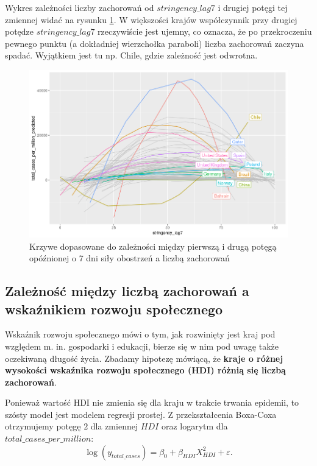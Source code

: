 \documentclass[12pt]{mwbk}
\theoremstyle{plain}
\theoremstyle{definition}
\theoremstyle{definition}
\newcommand\zrodlo[1]{\par\vspace{-3mm}{\small\textit{Źródło: }#1 }}
\begin{document}
\newpage
Wykres zależności liczby zachorowań od $stringency\_lag7$ i drugiej potęgi tej zmiennej widać na rysunku \ref{fig:stringency_2st}. W większości krajów współczynnik przy drugiej potędze $stringency\_lag7$ rzeczywiście jest ujemny, co oznacza, że po przekroczeniu pewnego punktu (a dokładniej wierzchołka paraboli) liczba zachorowań zaczyna spadać. Wyjątkiem jest tu np. Chile, gdzie zależność jest odwrotna.

\newpage

\begin{figure}[!h]
	\centering
	\includegraphics[width=\linewidth]{rys/stringency_2st.png}
	\caption{Krzywe dopasowane do zależności między pierwszą i drugą potęgą opóźnionej o 7 dni siły obostrzeń a liczbą zachorowań }
	\label{fig:stringency_2st}
	\zrodlo{Opracowanie własne}
\end{figure}


\subsection{Zależność między liczbą zachorowań a wskaźnikiem rozwoju społecznego}

Wskaźnik rozwoju społecznego mówi o tym, jak rozwinięty jest kraj pod względem m. in. gospodarki i edukacji, bierze się w nim pod uwagę także oczekiwaną długość życia. Zbadamy hipotezę mówiącą, że \textbf{kraje o różnej wysokości wskaźnika rozwoju społecznego (HDI) różnią się liczbą zachorowań}.

Ponieważ wartość HDI nie zmienia się dla kraju w trakcie trwania epidemii, to szósty model jest modelem regresji prostej.
Z przekształcenia Boxa-Coxa otrzymujemy potęgę $2$ dla zmiennej $HDI$ oraz logarytm dla $total\_cases\_per\_million$:
$$\log(y_{total\_cases})=\beta_0+\beta_{HDI}X^2_{HDI}+\varepsilon.$$
\end{document}
